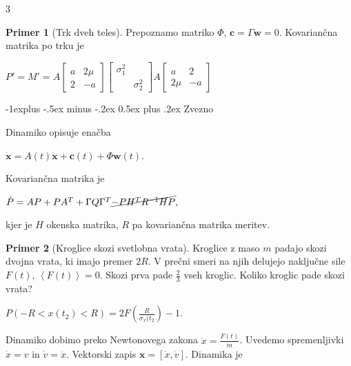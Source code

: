 \documentclass[10pt,landscape]{article}
\makeatletter
\renewcommand{\subsection}{\@startsection{subsection}{2}{0mm}%
	{-1explus -.5ex minus -.2ex}%
	{0.5ex plus .2ex}%
	{\normalfont\normalsize\bfseries}}
\theoremstyle{definition}
\newtheorem*{primer}{Primer}
\makeatother
\begin{document}
\begin{multicols}{3}
\begin{primer}[Trk dveh teles]
  Prepoznamo matriko \( \Phi \), \( \mathbf{c} = \Gamma \mathbf{w} = 0 \). Kovariančna matrika po trku je

  \( P' = M' = A \begin{bmatrix}
                 a & 2\mu \\
                 2 & - a
                  \end{bmatrix}\begin{bmatrix}
                               \sigma_{1}^2 &  \\
                                & \sigma_2 ^2
                                \end{bmatrix} A \begin{bmatrix}
                                              a & 2 \\
                                              2\mu & - a
                                               \end{bmatrix}\)
\end{primer}

\subsection{Zvezno}

Dinamiko opisuje enačba

\( \dot{\mathbf{x}} = A (t) \mathbf{x} + \mathbf{c}(t) + \Phi \mathbf{w} (t) \).

Kovariančna matrika je

\( \dot{P} = AP + PA^T + \Gamma Q \Gamma^T \cancel{- PH^T R^{-1} H P},
\)

kjer je \( H \) okenska matrika, \( R \) pa kovariančna matrika meritev.

\begin{primer}[Kroglice skozi svetlobna vrata]
Kroglice z maso \( m \) padajo skozi dvojna vrata, ki imajo premer \( 2R \). V prečni smeri na njih delujejo naključne sile \( F(t) \), \( \left\langle F(t) \right\rangle = 0 \). Skozi prva pade \( \frac{2}{3} \) vseh kroglic. Koliko kroglic pade skozi vrata?

\( P \left( - R < x(t_{2}) < R \right) = 2 F \left( \frac{R}{\sigma_x (t_2} \right) - 1 \).

Dinamiko dobimo preko Newtonovega zakona \( \ddot{x} = \frac{F(t)}{m} \). Uvedemo spremenljivki \( \dot{x} = v \) in \( \dot{v} = \ddot{x} \). Vektorski zapis \( \mathbf{x} = [\dot{x}, \dot{v}] \). Dinamika je


\end{primer}
\end{multicols}
\end{document}
